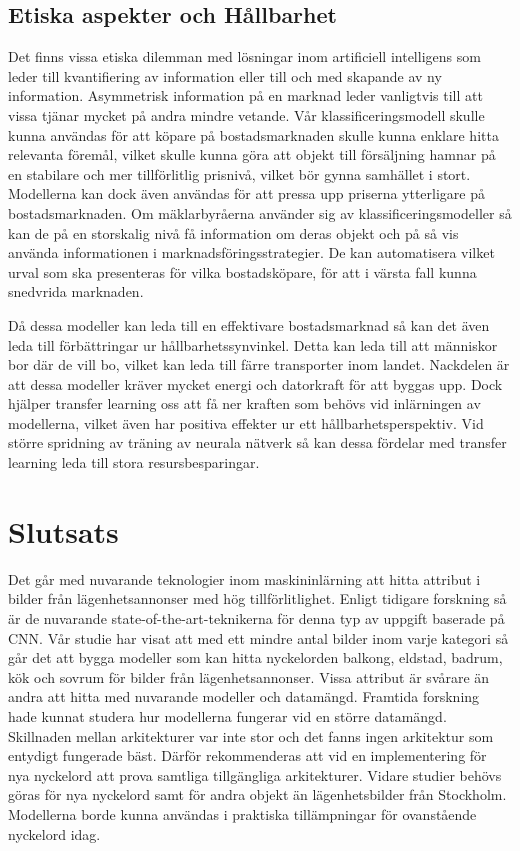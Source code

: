 \documentclass[]{kththesis}
\begin{document}
\section{Etiska aspekter och Hållbarhet}
Det finns vissa etiska dilemman med lösningar inom artificiell intelligens som leder till kvantifiering av information eller till och med skapande av ny information. Asymmetrisk information på en marknad leder vanligtvis till att vissa tjänar mycket på andra mindre vetande. Vår klassificeringsmodell skulle kunna användas för att köpare på bostadsmarknaden skulle kunna enklare hitta relevanta föremål, vilket skulle kunna göra att objekt till försäljning hamnar på en stabilare och mer tillförlitlig prisnivå, vilket bör gynna samhället i stort. Modellerna kan dock även användas för att pressa upp priserna ytterligare på bostadsmarknaden. Om mäklarbyråerna använder sig av klassificeringsmodeller så kan de på en storskalig nivå få information om deras objekt och på så vis använda informationen i marknadsföringsstrategier. De kan automatisera vilket urval som ska presenteras för vilka bostadsköpare, för att i värsta fall kunna snedvrida marknaden.

Då dessa modeller kan leda till en effektivare bostadsmarknad så kan det även leda till förbättringar ur hållbarhetssynvinkel. Detta kan leda till att människor bor där de vill bo, vilket kan leda till färre transporter inom landet. Nackdelen är att dessa modeller kräver mycket energi och datorkraft för att byggas upp. Dock hjälper transfer learning oss att få ner kraften som behövs vid inlärningen av modellerna, vilket även har positiva effekter ur ett hållbarhetsperspektiv. Vid större spridning av träning av neurala nätverk så kan dessa fördelar med transfer learning leda till stora resursbesparingar.

\chapter{Slutsats}
Det går med nuvarande teknologier inom maskininlärning att hitta attribut i bilder från lägenhetsannonser med hög tillförlitlighet. Enligt tidigare forskning så är de nuvarande state-of-the-art-teknikerna för denna typ av uppgift baserade på CNN. Vår studie har visat att med ett mindre antal bilder inom varje kategori så går det att bygga modeller som kan hitta nyckelorden balkong, eldstad, badrum, kök och sovrum för bilder från lägenhetsannonser. Vissa attribut är svårare än andra att hitta med nuvarande modeller och datamängd. Framtida forskning hade kunnat studera hur modellerna fungerar vid en större datamängd. Skillnaden mellan arkitekturer var inte stor och det fanns ingen arkitektur som entydigt fungerade bäst. Därför rekommenderas att vid en implementering för nya nyckelord att prova samtliga tillgängliga arkitekturer. Vidare studier behövs göras för nya nyckelord samt för andra objekt än lägenhetsbilder från Stockholm. Modellerna borde kunna användas i praktiska tillämpningar för ovanstående nyckelord idag.
\end{document}
